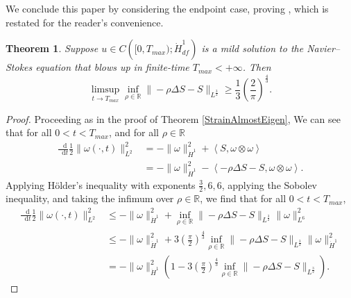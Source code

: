 \documentclass[11pt]{article}
\theoremstyle{plain}
\newtheorem{theorem}{Theorem}[section]
\theoremstyle{remark}
\numberwithin{equation}{section}
\newcommand{\diff}{\mathop{}\!\mathrm{d}}
\begin{document}
We conclude this paper by considering the endpoint case, proving ,
which is restated for the reader's convenience.

\begin{theorem} \label{StrainAlmostEigenEndpoint}
Suppose $u\in C\left([0,T_{max});\dot{H}^1_{df}\right)$
is a mild solution to the Navier--Stokes equation
that blows up in finite-time $T_{max}<+\infty$.
Then
\begin{equation}
    \limsup_{t\to T_{max}} 
    \inf_{\rho\in\mathbb{R}}
    \|-\rho\Delta S-S\|_{L^\frac{3}{2}}
    \geq
    \frac{1}{3}
    \left(\frac{2}{\pi}\right)^\frac{4}{3}.
\end{equation}
\end{theorem}


\begin{proof}
Proceeding as in the proof of Theorem \ref{StrainAlmostEigen},
We can see that for all $0<t<T_{max}$,
and for all $\rho\in\mathbb{R}$
\begin{align}
    \frac{\diff}{\diff t}
    \frac{1}{2}\|\omega(\cdot,t)\|_{L^2}^2
    &=
    -\|\omega\|_{\dot{H}^1}^2
    +\left<S,\omega\otimes\omega\right> \\
    &=
    -\|\omega\|_{\dot{H}^1}^2
    -\left<-\rho\Delta S-S,\omega\otimes\omega\right>.
\end{align}
Applying H\"older's inequality with exponents $\frac{3}{2},6,6$,
applying the Sobolev inequality, 
and taking the infimum over $\rho\in\mathbb{R}$,
we find that for all $0<t<T_{max}$,
\begin{align}
    \frac{\diff}{\diff t}
    \frac{1}{2}\|\omega(\cdot,t)\|_{L^2}^2
    &\leq
    -\|\omega\|_{\dot{H}^1}^2
    +\inf_{\rho\in\mathbb{R}}
    \|-\rho\Delta S-S\|_{L^\frac{3}{2}}
    \|\omega\|_{L^6}^2 \\
    &\leq
    -\|\omega\|_{\dot{H}^1}^2
    +3\left(\frac{\pi}{2}\right)^\frac{4}{3}
    \inf_{\rho\in\mathbb{R}}
    \|-\rho\Delta S-S\|_{L^\frac{3}{2}}
    \|\omega\|_{\dot{H}^1}^2 \\
    &=
    -\|\omega\|_{\dot{H}^1}^2
    \left(1-3\left(\frac{\pi}{2}\right)^\frac{4}{3}
    \inf_{\rho\in\mathbb{R}}
    \|-\rho\Delta S-S\|_{L^\frac{3}{2}}\right).
\end{align}




\end{proof}
\end{document}
